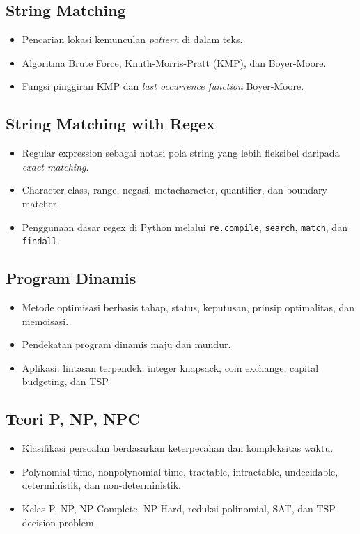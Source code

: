 \documentclass[11pt,a4paper]{article}
\begin{document}
\subsection{String Matching}
\begin{itemize}
    \item Pencarian lokasi kemunculan \textit{pattern} di dalam teks.
    \item Algoritma Brute Force, Knuth-Morris-Pratt (KMP), dan Boyer-Moore.
    \item Fungsi pinggiran KMP dan \textit{last occurrence function}
        Boyer-Moore.
\end{itemize}

\subsection{String Matching with Regex}
\begin{itemize}
    \item Regular expression sebagai notasi pola string yang lebih
        fleksibel daripada \textit{exact matching}.
    \item Character class, range, negasi, metacharacter, quantifier,
        dan boundary matcher.
    \item Penggunaan dasar regex di Python melalui
        \texttt{re.compile}, \texttt{search}, \texttt{match}, dan
        \texttt{findall}.
\end{itemize}

\subsection{Program Dinamis}
\begin{itemize}
    \item Metode optimisasi berbasis tahap, status, keputusan,
        prinsip optimalitas, dan memoisasi.
    \item Pendekatan program dinamis maju dan mundur.
    \item Aplikasi: lintasan terpendek, integer knapsack, coin
        exchange, capital budgeting, dan TSP.
\end{itemize}

\subsection{Teori P, NP, NPC}
\begin{itemize}
    \item Klasifikasi persoalan berdasarkan keterpecahan dan kompleksitas waktu.
    \item Polynomial-time, nonpolynomial-time, tractable,
        intractable, undecidable, deterministik, dan non-deterministik.
    \item Kelas P, NP, NP-Complete, NP-Hard, reduksi polinomial, SAT,
        dan TSP decision problem.
\end{itemize}

\newpage








\end{document}
